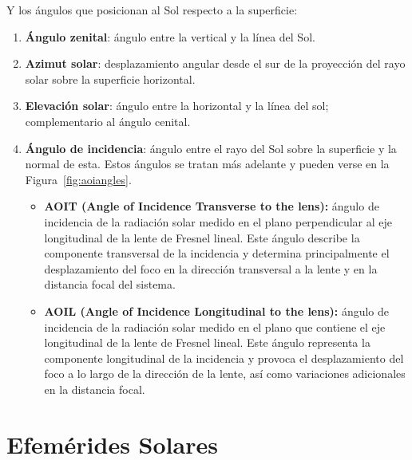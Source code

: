 Y los ángulos que posicionan al Sol respecto a la superficie:

\begin{enumerate}
    \item[$\theta_z$] \textbf{Ángulo zenital}: ángulo entre la vertical y la línea del Sol. 
    \item [$\gamma_s$]\textbf{Azimut solar}: desplazamiento angular desde el sur de la proyección del rayo solar sobre la superficie horizontal.
    \item[$\alpha_s$]\textbf{Elevación solar}: ángulo entre la horizontal y la línea del sol; complementario al ángulo cenital.
    \item [$\theta$]\textbf{Ángulo de incidencia}: ángulo entre el rayo del Sol sobre la superficie y la normal de esta. Estos ángulos se tratan más adelante y pueden verse en la Figura~\ref{fig:aoiangles}. 
	\begin{itemize}
		\item \textbf{AOIT (Angle of Incidence Transverse to the lens):} ángulo de incidencia de la radiación solar medido en el plano perpendicular al eje longitudinal de la lente de Fresnel lineal. Este ángulo describe la componente transversal de la incidencia y determina principalmente el desplazamiento del foco en la dirección transversal a la lente y en la distancia focal del sistema.
		
		\item \textbf{AOIL (Angle of Incidence Longitudinal to the lens):} ángulo de incidencia de la radiación solar medido en el plano que contiene el eje longitudinal de la lente de Fresnel lineal. Este ángulo representa la componente longitudinal de la incidencia y provoca el desplazamiento del foco a lo largo de la dirección de la lente, así como variaciones adicionales en la distancia focal.
	\end{itemize}

\end{enumerate}   

\section{Efemérides Solares} \label{sec:ef_sol}

